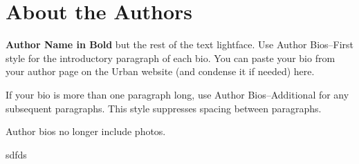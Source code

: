 \documentclass{urban-formatting}
\begin{document}
\newpage
\part*{About the Authors}
\textbf{Author Name in Bold} but the rest of the text lightface. Use Author Bios--First style for the introductory paragraph of each bio. You can paste your bio from your author page on the Urban website (and condense it if needed) here. 

If your bio is more than one paragraph long, use Author Bios--Additional for any subsequent paragraphs. This style suppresses spacing between paragraphs.

Author bios no longer include photos.


\newpage
\thispagestyle{empty}
sdfds
\end{document}
